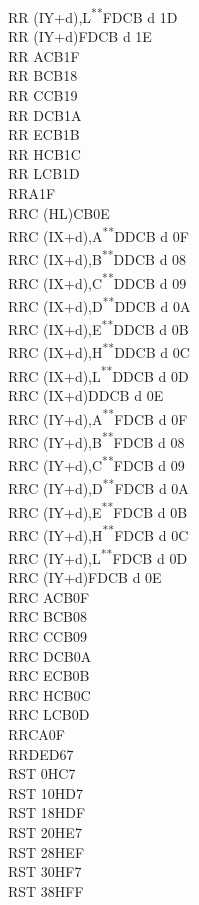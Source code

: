 \documentclass[twoside,openright,a4paper]{book}
\newcommand{\UNDOC}{\textnormal{\textsuperscript{**}}}
\begin{document}
\begin{multicols}{3}
{\begin{tabbing}
	RR (IY+d),L\UNDOC\>FDCB d 1D\\
	RR (IY+d)\>FDCB d 1E\\
	RR A\>CB1F\\
	RR B\>CB18\\
	RR C\>CB19\\
	RR D\>CB1A\\
	RR E\>CB1B\\
	RR H\>CB1C\\
	RR L\>CB1D\\
	RRA\>1F\\
	RRC (HL)\>CB0E\\
	RRC (IX+d),A\UNDOC\>DDCB d 0F\\
	RRC (IX+d),B\UNDOC\>DDCB d 08\\
	RRC (IX+d),C\UNDOC\>DDCB d 09\\
	RRC (IX+d),D\UNDOC\>DDCB d 0A\\
	RRC (IX+d),E\UNDOC\>DDCB d 0B\\
	RRC (IX+d),H\UNDOC\>DDCB d 0C\\
	RRC (IX+d),L\UNDOC\>DDCB d 0D\\
	RRC (IX+d)\>DDCB d 0E\\
	RRC (IY+d),A\UNDOC\>FDCB d 0F\\
	RRC (IY+d),B\UNDOC\>FDCB d 08\\
	RRC (IY+d),C\UNDOC\>FDCB d 09\\
	RRC (IY+d),D\UNDOC\>FDCB d 0A\\
	RRC (IY+d),E\UNDOC\>FDCB d 0B\\
	RRC (IY+d),H\UNDOC\>FDCB d 0C\\
	RRC (IY+d),L\UNDOC\>FDCB d 0D\\
	RRC (IY+d)\>FDCB d 0E\\
	RRC A\>CB0F\\
	RRC B\>CB08\\
	RRC C\>CB09\\
	RRC D\>CB0A\\
	RRC E\>CB0B\\
	RRC H\>CB0C\\
	RRC L\>CB0D\\
	RRCA\>0F\\
	RRD\>ED67\\
	RST 0H\>C7\\
	RST 10H\>D7\\
	RST 18H\>DF\\
	RST 20H\>E7\\
	RST 28H\>EF\\
	RST 30H\>F7\\
	RST 38H\>FF\\

\end{tabbing}}
\end{multicols}
\end{document}
